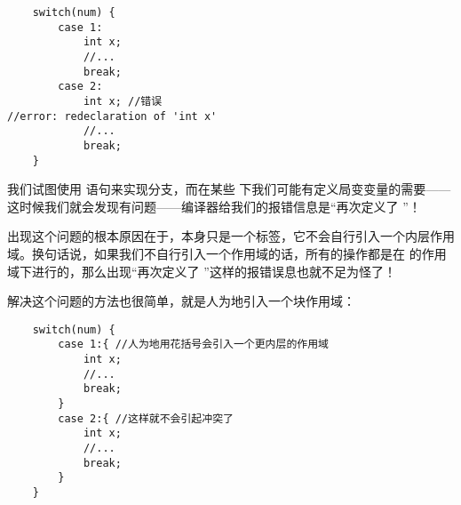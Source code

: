 \begin{lstlisting}
    switch(num) {
        case 1:
            int x;
            //...
            break;
        case 2:
            int x; //错误
//error: redeclaration of 'int x'
            //...
            break;
    }
\end{lstlisting}
我们试图使用 \lstinline@switch@ 语句来实现分支，而在某些 \lstinline@case@ 下我们可能有定义局变变量的需要——这时候我们就会发现有问题——编译器给我们的报错信息是``再次定义了 \lstinline@x@''！\par
出现这个问题的根本原因在于，\lstinline@case@ 本身只是一个标签，它不会自行引入一个内层作用域。换句话说，如果我们不自行引入一个作用域的话，所有的操作都是在 \lstinline@switch@ 的作用域下进行的，那么出现``再次定义了 \lstinline@x@''这样的报错误息也就不足为怪了！\par
解决这个问题的方法也很简单，就是人为地引入一个块作用域：
\begin{lstlisting}
    switch(num) {
        case 1:{ //人为地用花括号会引入一个更内层的作用域
            int x;
            //...
            break;
        }
        case 2:{ //这样就不会引起冲突了
            int x;
            //...
            break;
        }
    }
\end{lstlisting}\par
